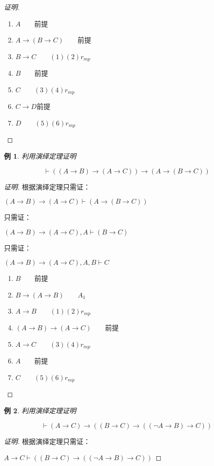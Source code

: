 \documentclass{article}
\newtheorem*{Example}{例}
\begin{document}
\begin{CJK*}{UTF8}{gbsn}
\begin{proof}[证明]
\begin{enumerate}
  \item $A\qquad$前提
  \item $A\to (B\to C)\qquad$前提
  \item $B\to C\qquad (1)(2)r_{mp}$
  \item $B\qquad$前提
  \item $C\qquad(3)(4)r_{mp}$
  \item $C\to D$前提
  \item $D\qquad(5)(6)r_{mp}$
\end{enumerate}
\end{proof}
\begin{Example}
  利用演绎定理证明

  \[\vdash ((A\to B)\to (A\to C))\to (A\to (B\to C))\]
\end{Example}
\begin{proof}[证明]

  根据演绎定理只需证：
  
  $(A\to B)\to (A\to C)\vdash (A\to (B\to C))$

  只需证：

  $(A\to B)\to (A\to C), A\vdash (B\to C)$

  只需证：

  $(A\to B)\to (A\to C), A, B\vdash C$

  \begin{enumerate}
    \item $B\qquad$前提
    \item $B\to (A\to B)\qquad A_1$
    \item $A\to B\qquad (1)(2)r_{mp}$
    \item $(A\to B)\to (A\to C)\qquad$前提
    \item $A\to C\qquad (3)(4)r_{mp}$
    \item $A\qquad$前提
    \item $C\qquad(5)(6)r_{mp}$
  \end{enumerate}
\end{proof}
  


\begin{Example}
  利用演绎定理证明

  \[\vdash (A\to C)\to ((B\to C)\to ((\lnot A\to B)\to C))\]
\end{Example}

\begin{proof}[证明]
根据演绎定理只需证：

$A\to C\vdash ((B\to C)\to ((\lnot A\to B)\to C))$


\end{proof}
\end{CJK*}
\end{document}
